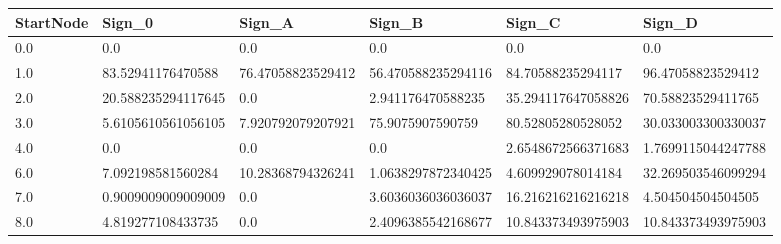 \begin{tabular}{llllll}
\hline
StartNode & Sign\_0 & Sign\_A & Sign\_B & Sign\_C & Sign\_D \\ \hline
0.0 & 0.0 & 0.0 & 0.0 & 0.0 & 0.0 \\
1.0 & 83.52941176470588 & 76.47058823529412 & 56.470588235294116 & 84.70588235294117 & 96.47058823529412 \\
2.0 & 20.588235294117645 & 0.0 & 2.941176470588235 & 35.294117647058826 & 70.58823529411765 \\
3.0 & 5.6105610561056105 & 7.920792079207921 & 75.9075907590759 & 80.52805280528052 & 30.033003300330037 \\
4.0 & 0.0 & 0.0 & 0.0 & 2.6548672566371683 & 1.7699115044247788 \\
6.0 & 7.092198581560284 & 10.28368794326241 & 1.0638297872340425 & 4.609929078014184 & 32.269503546099294 \\
7.0 & 0.9009009009009009 & 0.0 & 3.6036036036036037 & 16.216216216216218 & 4.504504504504505 \\
8.0 & 4.819277108433735 & 0.0 & 2.4096385542168677 & 10.843373493975903 & 10.843373493975903 \\
\hline
\end{tabular}
